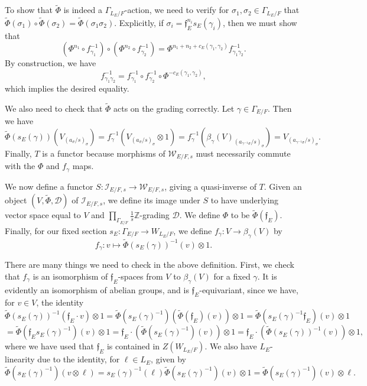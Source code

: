 \documentclass[11pt]{amsart}
\theoremstyle{definition}
\newcommand{\mc}{\mathcal}
\newcommand{\Z}{\mathbb{Z}}
\newcommand{\mf}{\mathfrak}
\begin{document}
To show that $\tilde{\Phi}$ is indeed a $\Gamma_{L_E/F}$-action, we need to verify for $\sigma_1, \sigma_2 \in \Gamma_{L_E/F}$ that $\tilde{\Phi}(\sigma_1) \circ \tilde{\Phi}(\sigma_2) = \tilde{\Phi}(\sigma_1\sigma_2)$. Explicitly, if $\sigma_i = \mf{f}_{E}^{n_i} s_E(\gamma_i)$, then we must show that
\begin{equation*}
    (\Phi^{n_1} \circ f^{-1}_{\gamma_1}) \circ (\Phi^{n_2} \circ f^{-1}_{\gamma_2}) = \Phi^{n_1+n_2 + c_E(\gamma_1,\gamma_2)}f^{-1}_{\gamma_1\gamma_2}. 
\end{equation*}
By construction, we have
\begin{equation*}
    f^{-1}_{\gamma_1\gamma_2} = f^{-1}_{\gamma_1} \circ f^{-1}_{\gamma_2} \circ \Phi^{-c_E(\gamma_1,\gamma_2)},
\end{equation*}
which implies the desired equality. 

We also need to check that $\tilde{\Phi}$ acts on the grading correctly. Let $\gamma \in \Gamma_{E/F}$. Then we have
\begin{equation*}
\tilde{\Phi}(s_E(\gamma))(V_{(a_{\sigma}/s)_{\sigma}}) = f^{-1}_{\gamma}(V_{(a_{\sigma}/s)_{\sigma}}\otimes 1)=f^{-1}_{\gamma}(\beta_{\gamma}(V)_{(a_{\gamma^{-1}\sigma}/s)_{\sigma}})=V_{(a_{\gamma^{-1}\sigma}/s)_{\sigma}}.
\end{equation*}
Finally, $T$ is a functor because morphisms of $\mc{W}_{E/F,s}$ must necessarily commute with the $\Phi$ and $f_{\gamma}$ maps.

We now define a functor $S: \mc{I}_{E/F, s} \to \mc{W}_{E/F, s}$, giving a quasi-inverse of $T$. Given an object $(V, \tilde{\Phi}, \mc{D})$ of $\mc{I}_{E/F, s}$, we define its image under $S$ to have underlying vector space equal to $V$ and $\prod\limits_{\Gamma_{E/F}} \frac{1}{s} \Z$-grading $\mc{D}$. We define $\Phi$ to be $\tilde{\Phi}(\mf{f}_E)$. Finally, for our fixed section $s_E: \Gamma_{E/F} \to W_{L_E/F}$, we define $f_{\gamma}: V \to \beta_{\gamma}(V)$ by
\begin{equation*}
    f_{\gamma}: v \mapsto \tilde{\Phi}(s_E(\gamma))^{-1}(v) \otimes 1.
\end{equation*}

There are many things we need to check in the above definition. First, we check that $f_{\gamma}$ is an isomorphism of $\mf{f}_{E}$-spaces from $V$ to $\beta_{\gamma}(V)$ for a fixed $\gamma$. It is evidently an isomorphism of abelian groups, and is $\mf{f}_{E}$-equivariant, since we have, for $v \in V$, the identity $$\tilde{\Phi}(s_{E}(\gamma))^{-1}(\mf{f}_{E} \cdot v) \otimes 1 = \tilde{\Phi}(s_{E}(\gamma)^{-1})(\tilde{\Phi}(\mf{f}_{E})(v)) \otimes 1 = \tilde\Phi(s_{E}(\gamma)^{-1}\mf{f}_{E})(v) \otimes 1 $$
$$= \tilde{\Phi}(\mf{f}_{E} s_{E}(\gamma)^{-1})(v) \otimes 1 = \mf{f}_{E} \cdot (\tilde{\Phi}(s_{E}(\gamma)^{-1})(v)) \otimes 1 = \mf{f}_{E} \cdot (\tilde{\Phi}(s_{E}(\gamma))^{-1}(v)) \otimes 1 ,$$ where we have used that $\mf{f}_{E}$ is contained in $Z(W_{L_{E}/F})$. We also have $L_{E}$-linearity due to the identity, for $\ell \in L_{E}$, given by $$\tilde{\Phi}(s_{E}(\gamma)^{-1})(v \otimes \ell) = s_{E}(\gamma)^{-1}(\ell)\tilde{\Phi}(s_{E}(\gamma)^{-1})(v) \otimes 1 = \tilde{\Phi}(s_{E}(\gamma)^{-1})(v) \otimes \ell.$$ 
\end{document}
